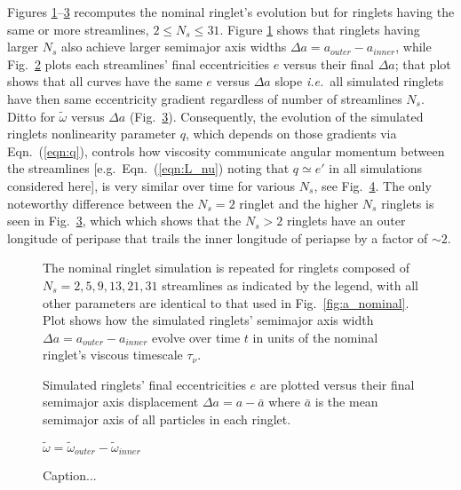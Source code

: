 \documentclass[preprint]{aastex62}
\begin{document}
Figures \ref{fig:a_versus_t_streamlines}--\ref{fig:wt_vs_da_streamlines} recomputes the nominal
ringlet's evolution but for ringlets having the same or more streamlines, $2\le N_s\le31$. 
Figure \ref{fig:a_versus_t_streamlines} shows that ringlets having larger $N_s$
also achieve larger semimajor axis widths $\Delta a = a_{outer} - a_{inner}$, while Fig.\  
\ref{fig:e_vs_da_streamlines} plots each streamlines' final eccentricities $e$
versus their final $\Delta a$; that plot shows
that all curves have the same $e$ versus $\Delta a$ slope
{\it i.e.}\ all simulated ringlets have then same eccentricity gradient regardless of 
number of streamlines $N_s$. Ditto for $\tilde{\omega}$ versus $\Delta a$
(Fig.\ \ref{fig:wt_vs_da_streamlines}).
Consequently, the evolution of the simulated ringlets
nonlinearity parameter $q$, which depends on those gradients via Eqn.\ (\ref{eqn:q}),
controls how viscosity communicate angular momentum between
the streamlines [e.g.\ Eqn.\ (\ref{eqn:L_nu}) noting that $q\simeq e'$ in all simulations considered here], 
is very similar over time for various $N_s$, see Fig.\ \ref{fig:q_versus_t_streamlines}.
The only noteworthy difference between the $N_s=2$ ringlet and the higher $N_s$
ringlets is seen in Fig.\ \ref{fig:wt_vs_da_streamlines}, which 
which shows that the $N_s>2$ ringlets have an outer longitude of peripase that trails
the inner longitude of periapse by a factor of $\sim2$.
\begin{figure}
    \caption{
        \label{fig:a_versus_t_streamlines}
        The nominal ringlet simulation is repeated for ringlets composed of $N_s=2,5,9,13,21,31$ streamlines
        as indicated by the legend, with all other parameters are identical to that used in Fig.\ \ref{fig:a_nominal}.
        Plot shows how the simulated ringlets' semimajor axis width $\Delta a = a_{outer} - a_{inner}$
        evolve over time $t$ in units of the nominal ringlet's viscous timescale $\tau_\nu$.
    }
\end{figure}
\begin{figure}
    \caption{
        \label{fig:e_vs_da_streamlines}
        Simulated ringlets' final eccentricities $e$ are plotted versus their final
        semimajor axis displacement $\Delta a=a-\bar{a}$ where $\bar{a}$ is the mean semimajor
        axis of all particles in each ringlet.
    }
\end{figure}
\begin{figure}
    \caption{
        \label{fig:wt_vs_da_streamlines}
        $\tilde{\omega} = \tilde{\omega}_{outer} - \tilde{\omega}_{inner}$
    }
\end{figure}
\begin{figure}
    \caption{
        \label{fig:q_versus_t_streamlines}
        Caption...
    }
\end{figure}
\end{document}
